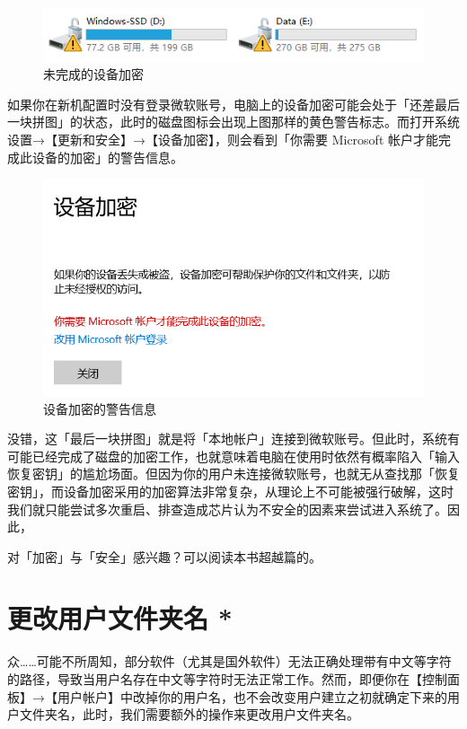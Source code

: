 {{{\begin{figure}[htb!]
  \centering
  \includegraphics[width=.7\textwidth]{assets/advanced/Bitlocker_Unfinished.png}
  \caption{未完成的设备加密}
  \label{fig:Bitlocker_Unfinished}
\end{figure}

如果你在新机配置时没有登录微软账号，电脑上的设备加密可能会处于「还差最后一块拼图」的状态，此时的磁盘图标会出现上图那样的黄色警告标志。而打开系统设置→【更新和安全】→【设备加密】，则会看到「你需要 Microsoft 帐户才能完成此设备的加密」的警告信息。

\begin{figure}[htb!]
  \centering
  \includegraphics[width=.6\textwidth]{assets/advanced/Bitlocker_Info.png}
  \caption{设备加密的警告信息}
  \label{fig:Bitlocker_Info}
\end{figure}

没错，这「最后一块拼图」就是将「本地帐户」连接到微软账号。但此时，系统有可能已经完成了磁盘的加密工作，也就意味着电脑在使用时依然有概率陷入「输入恢复密钥」的尴尬场面。但因为你的用户未连接微软账号，也就无从查找那「恢复密钥」，而设备加密采用的加密算法非常复杂，从理论上不可能被强行破解，这时我们就只能尝试多次重启、排查造成芯片认为不安全的因素来尝试进入系统了。因此，

\begin{note}
  对「加密」与「安全」感兴趣？可以阅读本书超越篇的。
\end{note}

\section{更改用户文件夹名 *}

众……可能不所周知，部分软件（尤其是国外软件）无法正确处理带有中文等字符的路径，导致当用户名存在中文等字符时无法正常工作。然而，即便你在【控制面板】→【用户帐户】中改掉你的用户名，也不会改变用户建立之初就确定下来的用户文件夹名，此时，我们需要额外的操作来更改用户文件夹名。

}}}
